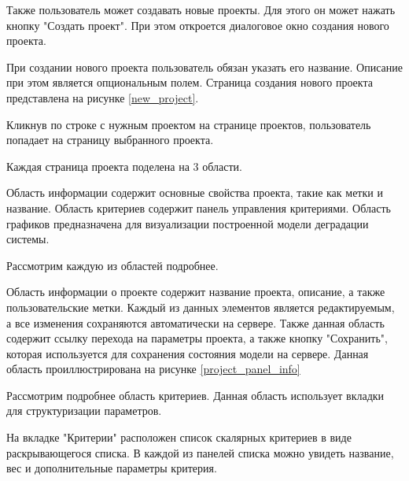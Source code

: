 
Также пользователь может создавать новые проекты. 
Для этого он может нажать кнопку "Создать проект". 
При этом откроется диалоговое окно создания нового проекта.

При создании нового проекта пользователь обязан указать его название. Описание при этом является опциональным полем.
Страница создания нового проекта представлена на рисунке \ref{new_project}.


Кликнув по строке с нужным проектом на странице проектов, пользователь попадает на страницу выбранного проекта.

Каждая страница проекта поделена на 3 области.

Область информации содержит основные свойства проекта, такие как метки и название.
Область критериев содержит панель управления критериями. 
Область графиков предназначена для визуализации построенной модели деградации системы.

Рассмотрим каждую из областей подробнее.

Область информации о проекте содержит название проекта, описание, а также пользовательские метки. 
Каждый из данных элементов является редактируемым, а все изменения сохраняются автоматически на сервере.
Также данная область содержит ссылку перехода на параметры проекта, а также кнопку "Сохранить", которая используется для сохранения состояния модели на сервере.
Данная область проиллюстрирована на рисунке \ref{project_panel_info}

 
Рассмотрим подробнее область критериев. Данная область использует вкладки для структуризации параметров.

На вкладке "Критерии" расположен список скалярных критериев в виде раскрывающегося списка. 
В каждой из панелей списка можно увидеть название, вес и дополнительные параметры критерия.

